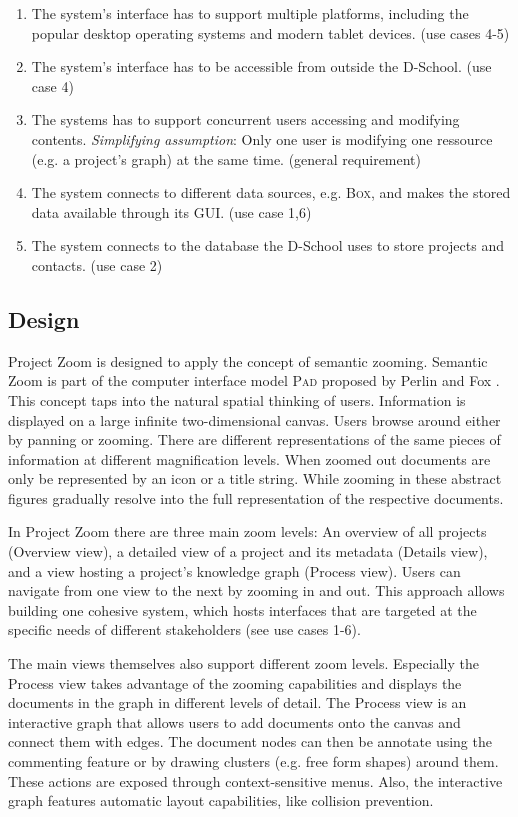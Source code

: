 \begin{enumerate}
\item The system's interface has to support multiple platforms, including the popular desktop operating systems and modern tablet devices. (use cases 4-5)
\item The system's interface has to be accessible from outside the D-School. (use case 4) 
\item The systems has to support concurrent users accessing and modifying contents. \textit{Simplifying assumption}: Only one user is modifying one ressource (e.g. a project's graph) at the same time. (general requirement)
\item The system connects to different data sources, e.g. \textsc{Box}, and makes the stored data available through its GUI. (use case 1,6)
\item The system connects to the database the D-School uses to store projects and contacts. (use case 2)

\end{enumerate}

\subsection{Design}

Project Zoom is designed to apply the concept of semantic zooming. Semantic Zoom is part of the computer interface model \textsc{Pad} proposed by Perlin and Fox \cite{Perlin_1993}. This concept taps into the natural spatial thinking of users. Information is displayed on a large infinite two-dimensional canvas. Users browse around either by panning or zooming. There are different representations of the same pieces of information at different magnification levels. When zoomed out documents are only be represented by an icon or a title string. While zooming in these abstract figures gradually resolve into the full representation of the respective documents. 

In Project Zoom there are three main zoom levels: An overview of all projects (Overview view), a detailed view of a project and its metadata (Details view), and a view hosting a project's knowledge graph (Process view). Users can navigate from one view to the next by zooming in and out. This approach allows building one cohesive system, which hosts interfaces that are targeted at the specific needs of different stakeholders (see use cases 1-6).

The main views themselves also support different zoom levels. Especially the Process view takes advantage of the zooming capabilities and displays the documents in the graph in different levels of detail. 
The Process view is an interactive graph that allows users to add documents onto the canvas and connect them with edges. The document nodes can then be annotate using the commenting feature or by drawing clusters (e.g. free form shapes) around them. These actions are exposed through context-sensitive menus. Also, the interactive graph features automatic layout capabilities, like collision prevention.


